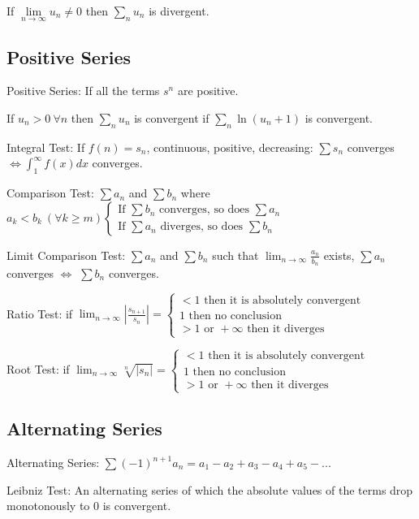 If $\lim\limits_{n\rightarrow\infty}u_n\neq0$ then $\sum\limits_n u_n$ is divergent.

\subsection{Positive Series}
Positive Series: If all the terms $ s^n $ are positive.

If $u_n>0~\forall n$ then $\sum\limits_n u_n$ is convergent if 
$\sum\limits_n\ln(u_n+1)$ is convergent.

Integral Test: If $ f(n) = s_n $, continuous, positive, decreasing: $\sum s_n$ converges $ \Leftrightarrow \int_{1}^{\infty}f(x)dx $ converges.

Comparison Test: $\sum a_n$ and $\sum b_n$ where $a_k<b_k ~ (\forall k\ge m) 
\begin{cases}
\text{If } \sum b_n \text{ converges, so does } \sum a_n \\
\text{If } \sum a_n \text{ diverges, so does } \sum b_n
\end{cases}
$

Limit Comparison Test: $\sum a_n$ and $\sum b_n$ such that $ \lim_{n\rightarrow\infty} \frac{a_n}{b_n}$ exists, $\sum a_n$ converges $\Leftrightarrow$ $\sum b_n$ converges.

Ratio Test: if $\lim_{n\rightarrow \infty}\left|\frac{s_{n+1}}{s_n}\right| = \begin{cases}
<1 \text{ then it is absolutely convergent} \\
1 \text{ then no conclusion} \\
>1 \text{ or } +\infty \text{ then it diverges}
\end{cases}
$

Root Test: if  $\lim_{n\rightarrow \infty} \sqrt[n]{\left|s_n\right|} = \begin{cases}
<1 \text{ then it is absolutely convergent} \\
1 \text{ then no conclusion} \\
>1 \text{ or } +\infty \text{ then it diverges}
\end{cases}
$

\subsection{Alternating Series}
Alternating Series: $ \sum(-1)^{n+1}a_n=a_1-a_2+a_3-a_4+a_5-... $

Leibniz Test: An alternating series of which the absolute values of the terms drop
monotonously to 0 is convergent.

